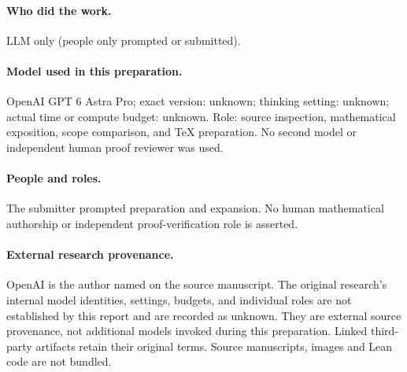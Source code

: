 \documentclass[11pt,a4paper]{article}
\numberwithin{equation}{section}
\theoremstyle{definition}
\theoremstyle{remark}
\begin{document}
\paragraph{Who did the work.} LLM only (people only prompted or submitted).
\paragraph{Model used in this preparation.} OpenAI GPT 6 Astra Pro; exact version:
unknown; thinking setting: unknown; actual time or compute budget: unknown.
Role: source inspection, mathematical exposition, scope comparison, and TeX
preparation. No second model or independent human proof reviewer was used.
\paragraph{People and roles.} The submitter prompted preparation and expansion. No human mathematical authorship or independent proof-verification role is asserted.
\paragraph{External research provenance.} OpenAI is the author named on the
source manuscript. The original research's internal model identities, settings,
budgets, and individual roles are not established by this report and are
recorded as unknown. They are external source provenance, not additional models
invoked during this preparation.
Linked third-party artifacts retain their original terms. Source manuscripts, images and Lean code are not bundled.
\end{document}
